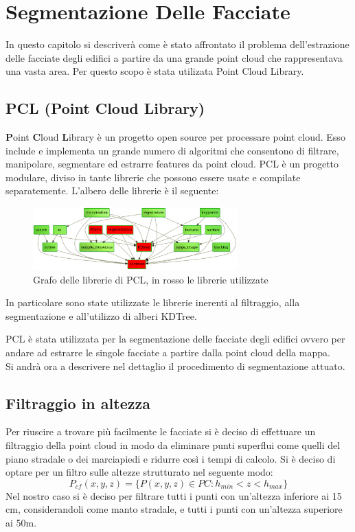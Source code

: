 \chapter{Segmentazione Delle Facciate}
\label{sez:Segmentazione}
In questo capitolo si descriverà come è stato affrontato il problema dell'estrazione delle facciate degli edifici a partire da una grande point cloud che rappresentava una vasta area. 
Per questo scopo è stata utilizata Point Cloud Library.

\section{PCL (Point Cloud Library)}
\label{sez:PCL}

\textbf{P}oint \textbf{C}loud \textbf{L}ibrary \cite{pcl} è un progetto open source per processare point cloud. Esso include e implementa un grande numero di algoritmi che consentono di filtrare, manipolare, segmentare ed estrarre features da point cloud. PCL è un progetto modulare, diviso in tante librerie che possono essere usate e compilate separatemente.
L'albero delle librerie è il seguente:

\begin{figure}[ht!]
    \centering
    \includegraphics[width=0.7\textwidth]{Immagini/pcl_dependency_graph2.png}
    \caption{Grafo delle librerie di PCL, in rosso le librerie utilizzate}
    \label{fig:PCLGraph}
\end{figure}

In particolare sono state utilizzate le librerie inerenti al filtraggio, alla segmentazione e all'utilizzo di alberi KDTree.

PCL è stata utilizzata per la segmentazione delle facciate degli edifici ovvero per andare ad estrarre le singole facciate a partire dalla point cloud della mappa.\\
Si andrà ora a descrivere nel dettaglio il procedimento di segmentazione attuato.

\section{Filtraggio in altezza}
Per riuscire a trovare più facilmente le facciate si è deciso di effettuare un filtraggio della point cloud in modo da eliminare punti superflui come quelli del piano stradale o dei marciapiedi e ridurre così i tempi di calcolo.\newline
Si è deciso di optare per un filtro sulle altezze strutturato nel seguente modo:
\begin{equation}
    P_{cf}(x,y,z) = \{P(x,y,z) \in PC : h_{min} < z < h_{max}\}
    \label{eq:Filte}
\end{equation}
Nel nostro caso si è deciso per filtrare tutti i punti con un'altezza inferiore ai 15 cm, considerandoli come manto stradale, e tutti i punti con un'altezza superiore ai 50m.\newline


